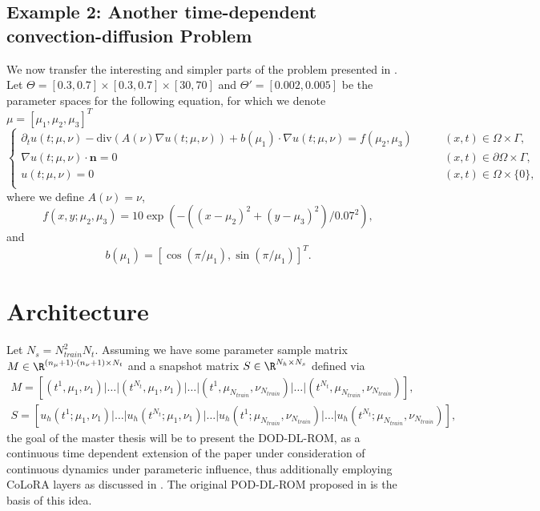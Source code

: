 \subsection{Example 2: Another time-dependent convection-diffusion Problem}
We now transfer the interesting and simpler parts of the problem presented in \cite{POD-DL-ROM}. Let $\Theta = [0.3, 0.7 ] \times [0.3, 0.7] \times [30, 70]$ and $\Theta' = [0.002, 0.005]$ be the parameter spaces for the following equation, for which we denote $\mu = [\mu_1, \mu_2, \mu_3]^T$
\begin{equation*} \begin{cases}
    \partial_t u(t; \mu, \nu) -  \mbox{div}\left( A(\nu) \nabla u(t; \mu, \nu) \right) + b(\mu_1) \cdot \nabla u(t; \mu, \nu) = f(\mu_2, \mu_3) \qquad &(x, t) \in \Omega \times \Gamma, \\
    \nabla u(t; \mu, \nu) \cdot \mathbf{n} = 0 \qquad &(x, t) \in \partial \Omega \times \Gamma, \\
    u(t; \mu, \nu) = 0 \qquad &(x, t) \in \Omega \times \{ 0\}, \\
    \end{cases}
\end{equation*}
where we define $A(\nu) = \nu$,
\begin{equation*}
    f(x, y; \mu_2, \mu_3) = 10 \exp \left(-((x - \mu_2)^2 + (y - \mu_3)^2) / 0.07^2\right),
\end{equation*}
and
\begin{equation*}
    b(\mu_1) = [\cos(\pi / \mu_1), \sin(\pi / \mu_1)]^T.
\end{equation*}


\section{Architecture}

Let $N_s = N_{train}^2 N_t$. Assuming we have some parameter sample matrix $M \in \R^{(n_{\mu} + 1) \cdot (n_{\nu} + 1) \times N_t}$ and a snapshot matrix $S \in \R^{N_h \times N_s}$ defined via
\begin{gather*}
    M = \left[(t^1, \mu_1, \nu_1) \vert \dots \vert (t^{N_t}, \mu_1, \nu_1) \vert \dots \vert (t^1, \mu_{N_{train}}, \nu_{N_{train}}) \vert \dots \vert (t^{N_t}, \mu_{N_{train}}, \nu_{N_{train}}) \right], \\
    S = \left[u_h(t^1; \mu_1, \nu_1) \vert \dots \vert u_h(t^{N_t}; \mu_1, \nu_1) \vert \dots \vert u_h(t^1; \mu_{N_{train}}, \nu_{N_{train}}) \vert \dots \vert u_h(t^{N_t}; \mu_{N_{train}}, \nu_{N_{train}}) \right],
\end{gather*}
the goal of the master thesis will be to present the DOD-DL-ROM, as a continuous time dependent extension of the paper \cite{DOD} under consideration of continuous dynamics under parameteric influence, thus additionally employing CoLoRA layers as discussed in \cite{CoLoRA}. The original POD-DL-ROM proposed in \cite{POD-DL-ROM} is the basis of this idea.

